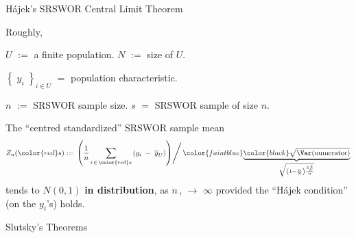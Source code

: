 \begin{frame}{\LARGE H\'{a}jek's SRSWOR Central Limit Theorem}

\vskip -0.1cm

{\large Roughly,

\vskip 0.2cm
\small
$U$ \;$:=$\; a finite population.
\quad
$N$ \;$:=$\; size of $U$.

$\left\{\;y_{i}\;\right\}_{i \in U}$ \;$=$\; population characteristic.

$n$ \;$:=$\; SRSWOR sample size.
\quad
{\color{red}$s$} \;$=$\; SRSWOR sample of size $n$.

\vskip 0.2cm
\large
\begin{center}
The ``centred standardized'' SRSWOR sample mean
\begin{equation*}
	Z_{n}({\color{red}s}) :=
	\left.\left(\dfrac{1}{n}\,\underset{i\,\in\,{\color{red}s}}{\sum}\,(y_{i}\;-\;\overline{y}_{U})\right)\right\slash
	{\color{faintblue}
	\underset
		{\sqrt{\left(1 - \frac{n}{N}\right)\frac{S^{\,2}_{U}}{n}}}
		{\underbrace{\color{black}\sqrt{\Var(\textnormal{numerator})}}}
	}
\end{equation*}
\vskip -0.2cm
tends to $N(0,1)$ {\color{gcblue}\textbf{in distribution}},\; as \;$n$\,, \;$\longrightarrow$\; $\infty$
\vskip 0.1cm
provided the {\color{red}``H\'{a}jek condition''} (on the $y_{i}$'s) holds.
\end{center}
}

\end{frame}
\normalsize

\begin{frame}{\Huge Slutsky's Theorems}

\begin{center}
\vskip -0.75cm

\end{center}

\end{frame}

